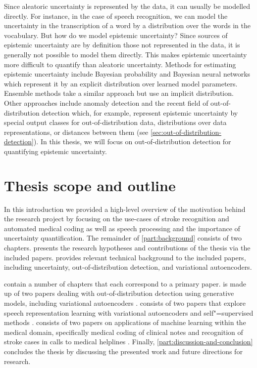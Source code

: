 Since aleatoric uncertainty is represented by the data, it can usually be modelled directly. For instance, in the case of speech recognition, we can model the uncertainty in the transcription of a word by a distribution over the words in the vocabulary. But how do we model epistemic uncertainty? 
Since sources of epistemic uncertainty are by definition those not represented in the data, it is generally not possible to model them directly. This makes epistemic uncertainty more difficult to quantify than aleatoric uncertainty. 
Methods for estimating epistemic uncertainty include Bayesian probability and Bayesian neural networks \parencite{mackay_practical_1992, neal_bayesian_1995} which represent it by an explicit distribution over learned model parameters. Ensemble methods \parencite{gal_dropout_2016,lakshminarayanan_simple_2017} take a similar approach but use an implicit distribution. 
Other approaches include anomaly detection and the recent field of out-of-distribution detection which, for example, represent epistemic uncertainty by special output classes for out-of-distribution data, distributions over data representations, or distances between them (see \cref{sec:out-of-distribution-detection}). In this thesis, we will focus on out-of-distribution detection for quantifying epistemic uncertainty. 


\section{Thesis scope and outline}

In this introduction we provided a high-level overview of the motivation behind the research project by focusing on the use-cases of stroke recognition and automated medical coding as well as speech processing and the importance of uncertainty quantification. 
The remainder of \cref{part:background} consists of two chapters. 
 presents the research hypotheses and contributions of the thesis via the included papers. 
 provides relevant technical background to the included papers, including uncertainty, out-of-distribution detection, and variational autoencoders. 

 contain a number of chapters that each correspond to a primary paper. 
 is made up of two papers dealing with out-of-distribution detection using generative models, including variational autoencoders \parencite{havtorn_hierarchical_2021,bergamin_modelagnostic_2022}. 
 consists of two papers that explore speech representation learning with variational autoencoders and self"=supervised methods \parencite{borgholt_brief_2022,havtorn_benchmarking_2022}. 
 consists of two papers on applications of machine learning within the medical domain, specifically medical coding of clinical notes \parencite{edin_automated_2023} and recognition of stroke cases in calls to medical helplines \parencite{wenstrup_retrospective_2023}. 
Finally, \cref{part:discussion-and-conclusion} concludes the thesis by discussing the presented work and future directions for research.
